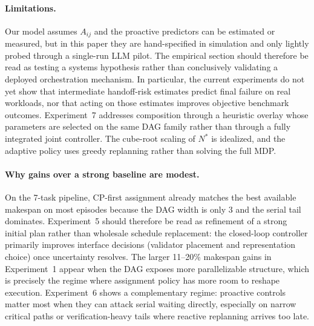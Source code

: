 \documentclass[10pt, twocolumn]{article}
\begin{document}
\paragraph{Limitations.}
Our model assumes $A_{ij}$ and the proactive predictors can be estimated or measured, but in this paper they are hand-specified in simulation and only lightly probed through a single-run LLM pilot. The empirical section should therefore be read as testing a systems hypothesis rather than conclusively validating a deployed orchestration mechanism. In particular, the current experiments do not yet show that intermediate handoff-risk estimates predict final failure on real workloads, nor that acting on those estimates improves objective benchmark outcomes. Experiment~7 addresses composition through a heuristic overlay whose parameters are selected on the same DAG family rather than through a fully integrated joint controller. The cube-root scaling of $N^*$ is idealized, and the adaptive policy uses greedy replanning rather than solving the full MDP.

\paragraph{Why gains over a strong baseline are modest.}
On the 7-task pipeline, CP-first assignment already matches the best available makespan on most episodes because the DAG width is only 3 and the serial tail dominates. Experiment~5 should therefore be read as refinement of a strong initial plan rather than wholesale schedule replacement: the closed-loop controller primarily improves interface decisions (validator placement and representation choice) once uncertainty resolves. The larger 11--20\% makespan gains in Experiment~1 appear when the DAG exposes more parallelizable structure, which is precisely the regime where assignment policy has more room to reshape execution. Experiment~6 shows a complementary regime: proactive controls matter most when they can attack serial waiting directly, especially on narrow critical paths or verification-heavy tails where reactive replanning arrives too late.
\end{document}
